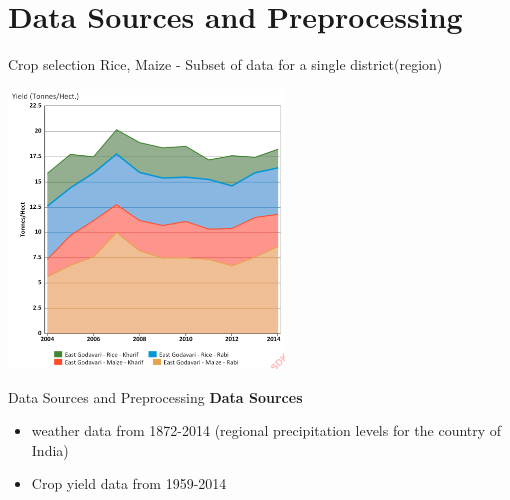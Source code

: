 \documentclass[10pt]{beamer}
\begin{document}
  \section{Data Sources and Preprocessing}
  \begin{frame}{Crop selection}
  	Rice, Maize - Subset of data for a single district(region)
  	\begin{center}
  	\includegraphics[width=0.55\textwidth]{ego_rice.png}
  	\end{center}
  \end{frame}
  \begin{frame}{Data Sources and Preprocessing}
	\textbf{Data Sources}
  	\begin{itemize}
  		\item weather data from 1872-2014 (regional precipitation levels for the country of India)
  		\item Crop yield data from 1959-2014
  	\end{itemize}
  \end{frame}
\end{document}
